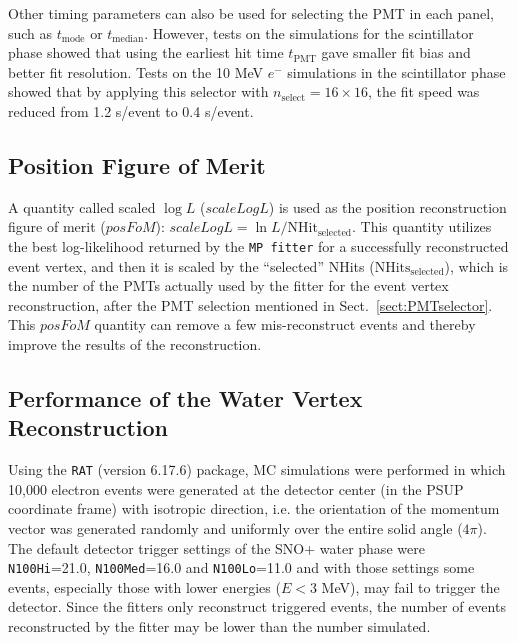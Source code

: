 \begin{itemize}
		Other timing parameters can also be used for selecting the PMT in each panel, such as $t_\mathrm{mode}$ or $t_\mathrm{median}$. However, tests on the simulations for the scintillator phase showed that using the earliest hit time $t_\mathrm{PMT}$ gave smaller fit bias and better fit resolution. Tests on the 10 MeV $e^-$ simulations in the scintillator phase showed that by applying this selector with $n_\mathrm{select}=16\times16$, the fit speed was reduced from 1.2 s/event to 0.4 s/event.
\end{itemize}

\subsection{Position Figure of Merit}\label{sect:positionFoM}

A quantity called scaled $\log L$ ($scaleLogL$) is used as the position reconstruction figure of merit ($posFoM$): $scaleLogL = \ln L/\mathrm{NHit}_\mathrm{selected}$. This quantity utilizes the best log-likelihood returned by the \texttt{MP fitter} for a successfully reconstructed event vertex, and then it is scaled by the ``selected'' NHits ($\mathrm{NHits}_\mathrm{selected}$), which is the number of the PMTs actually used by the fitter for the event vertex reconstruction, after the PMT selection mentioned in Sect.~\ref{sect:PMTselector}. This $posFoM$ quantity can remove a few mis-reconstruct events and thereby improve the results of the reconstruction.

\subsection{Performance of the Water Vertex Reconstruction}\label{sect:waterFitterVertex}

Using the \texttt{RAT} (version 6.17.6) package, MC simulations were performed in which 10,000 electron events were generated at the detector center (in the PSUP coordinate frame) with isotropic direction, i.e. the orientation of the momentum vector was generated randomly and uniformly over the entire solid angle ($4\pi$). The default detector trigger settings of the SNO+ water phase were \texttt{N100Hi}=21.0, \texttt{N100Med}=16.0 and \texttt{N100Lo}=11.0 and with those settings some events, especially those with lower energies ($E<3$ MeV), may fail to trigger the detector. Since the fitters only reconstruct triggered events, the number of events reconstructed by the fitter may be lower than the number simulated.

